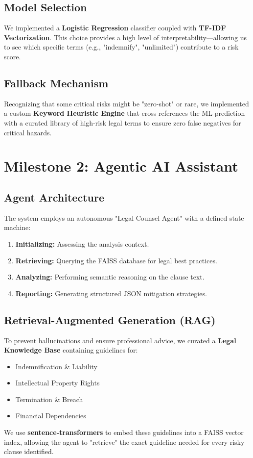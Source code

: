\documentclass[12pt, a4paper]{report}
\begin{document}
\section{Model Selection}
We implemented a \textbf{Logistic Regression} classifier coupled with \textbf{TF-IDF Vectorization}. This choice provides a high level of interpretability—allowing us to see which specific terms (e.g., "indemnify", "unlimited") contribute to a risk score.

\section{Fallback Mechanism}
Recognizing that some critical risks might be "zero-shot" or rare, we implemented a custom \textbf{Keyword Heuristic Engine} that cross-references the ML prediction with a curated library of high-risk legal terms to ensure zero false negatives for critical hazards.

\chapter{Milestone 2: Agentic AI Assistant}
\section{Agent Architecture}
The system employs an autonomous "Legal Counsel Agent" with a defined state machine:
\begin{enumerate}
    \item \textbf{Initializing:} Assessing the analysis context.
    \item \textbf{Retrieving:} Querying the FAISS database for legal best practices.
    \item \textbf{Analyzing:} Performing semantic reasoning on the clause text.
    \item \textbf{Reporting:} Generating structured JSON mitigation strategies.
\end{enumerate}

\section{Retrieval-Augmented Generation (RAG)}
To prevent hallucinations and ensure professional advice, we curated a \textbf{Legal Knowledge Base} containing guidelines for:
\begin{itemize}
    \item Indemnification & Liability
    \item Intellectual Property Rights
    \item Termination & Breach
    \item Financial Dependencies
\end{itemize}
We use \textbf{sentence-transformers} to embed these guidelines into a FAISS vector index, allowing the agent to "retrieve" the exact guideline needed for every risky clause identified.
\end{document}
